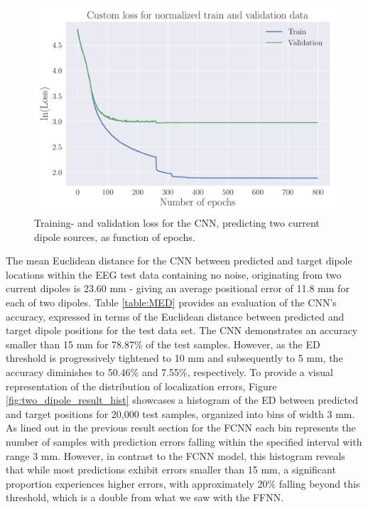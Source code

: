 \documentclass[a4paper, UKenglish, 11pt]{uiomaster}
\begin{document}
\begin{figure}[!htb]
    \centering
    \includegraphics[width=\linewidth]{figures/CNN/Custom_Loss_simple_last_run_old_std_2_dipoles_32_0.001_0.35_0.5_0_800_(0).pdf}
    \caption{Training- and validation loss for the CNN, predicting two current dipole sources, as function of epochs.}
    \label{fig:two_dipole_result_CNN}
\end{figure}

\FloatBarrier

The mean Euclidean distance for the CNN between predicted and target dipole locations within the EEG test data containing no noise, originating from two current dipoles is 23.60 mm - giving an average positional error of 11.8 mm for each of two dipoles. Table \ref{table:MED} provides an evaluation of the CNN's accuracy, expressed in terms of the Euclidean distance between predicted and target dipole positions for the test data set. The CNN demonstrates an accuracy smaller than 15 mm for 78.87$\%$ of the test samples. However, as the ED threshold is progressively tightened to 10 mm and subsequently to 5 mm, the accuracy diminishes to 50.46$\%$ and 7.55$\%$, respectively. To provide a visual representation of the distribution of localization errors, Figure \ref{fig:two_dipole_result_hist} showcases a histogram of the ED between predicted and target positions for 20,000 test samples, organized into bins of width 3 mm. As lined out in the previous result section for the FCNN each bin represents the number of samples with prediction errors falling within the specified interval with range 3 mm. However, in contrast to the FCNN model, this histogram reveals that while most predictions exhibit errors smaller than 15 mm, a significant proportion experiences higher errors, with approximately 20$\%$ falling beyond this threshold, which is a double from what we saw with the FFNN.
\end{document}
